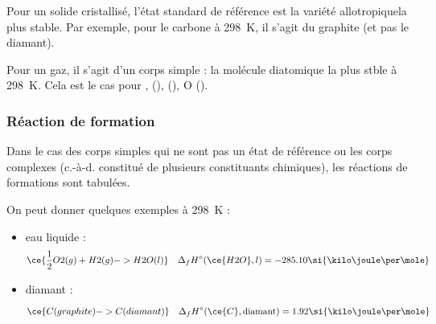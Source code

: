 
Pour un solide cristallisé, l'état standard de référence est la variété allotropiquela plus stable. Par exemple, pour le carbone à \SI{298}{\kelvin}, il s'agit du graphite (et pas le diamant).

Pour un gaz, il s'agit d'un corps simple : la molécule diatomique la plus stble à \SI{298}{\kelvin}. Cela est le cas pour  ,  (),  (), O ().


\subsubsection{Réaction de formation}

Dans le cas des corps simples qui ne sont pas un état de référence ou les corps complexes (c.-à-d. constitué de plusieurs constituants chimiques), les réactions de formations sont tabulées.


On peut donner quelques exemples à \SI{298}{\kelvin} : 

\begin{itemize}
\item eau liquide :
\begin{align*}
\ce{\frac{1}{2} O2 (g) + H2(g) -> H2O (l)} \quad \Delta_f H^\circ (\ce{H2O},l) = -285.10 \si{\kilo\joule\per\mole}
\end{align*}

\item diamant :
\begin{align*}
\ce{C (graphite) -> C(diamant)} \quad \Delta_f H^\circ (\ce{C},\text{diamant}) =  1.92 \si{\kilo\joule\per\mole}
\end{align*}
\end{itemize}

